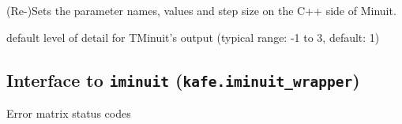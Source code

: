 \documentclass[a4paper,10pt,english]{sphinxmanual}
\begin{document}
\begin{fulllineitems}
\begin{fulllineitems}
\end{fulllineitems}


\begin{fulllineitems}
\label{module_doc:kafe.minuit.Minuit.update_parameter_data}
(Re-)Sets the parameter names, values and step size on the
C++ side of Minuit.

\end{fulllineitems}


\end{fulllineitems}


\begin{fulllineitems}
\label{module_doc:kafe.minuit.P_DETAIL_LEVEL}
default level of detail for TMinuit's output
(typical range: -1 to 3, default: 1)

\end{fulllineitems}



\subsection{Interface to \texttt{iminuit} (\texttt{kafe.iminuit\_wrapper})}
\label{module_doc:module-kafe.iminuit_wrapper}\label{module_doc:interface-to-iminuit-kafe-iminuit-wrapper}\label{module_doc:module-iminuit}

\begin{fulllineitems}
\label{module_doc:kafe.iminuit_wrapper.D_MATRIX_ERROR}
Error matrix status codes

\end{fulllineitems}

\end{document}
